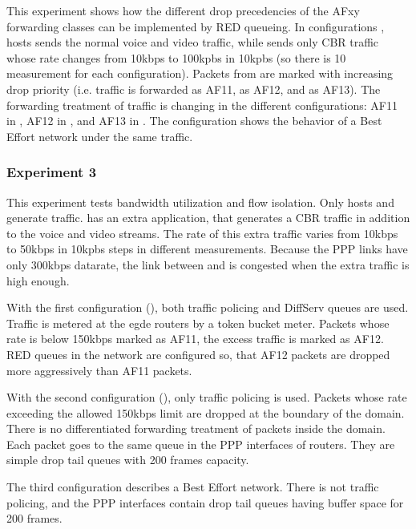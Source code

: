 This experiment shows how the different drop precedencies of the AFxy
forwarding classes can be implemented by RED queueing. In configurations
, hosts  sends the normal voice and video
traffic, while  sends only CBR traffic whose rate changes
from 10kbps to 100kpbs in 10kpbs (so there is 10 measurement for each
configuration). Packets from  are marked with
increasing drop priority (i.e.  traffic is forwarded as AF11,
 as AF12, and  as AF13). The forwarding treatment
of  traffic is changing in the different
configurations: AF11 in , AF12 in , and
AF13 in . The  configuration shows the behavior
of a Best Effort network under the same traffic.

\subsubsection*{Experiment 3}

This experiment tests bandwidth utilization and flow isolation.
Only hosts  and  generate traffic.  has
an extra  application, that generates a CBR
traffic in addition to the voice and video streams. The rate of
this extra traffic varies from 10kbps to 50kbps in 10kpbs steps
in different measurements. Because the PPP links have only
300kbps datarate, the link between  and  is
congested when the extra traffic is high enough.

With the first configuration (), both traffic policing
and DiffServ queues are used. Traffic is metered at the egde routers
by a token bucket meter. Packets whose rate is below 150kbps
marked as AF11, the excess traffic is marked as AF12. RED queues
in the network are configured so, that AF12 packets are dropped
more aggressively than AF11 packets.

With the second configuration (), only traffic policing
is used. Packets whose rate exceeding the allowed 150kbps limit
are dropped at the boundary of the domain. There is no differentiated
forwarding treatment of packets inside the domain. Each packet goes
to the same queue in the PPP interfaces of routers. They are simple
drop tail queues with 200 frames capacity.

The third configuration describes a Best Effort network.
There is not traffic policing, and the PPP interfaces contain
drop tail queues having buffer space for 200 frames.

